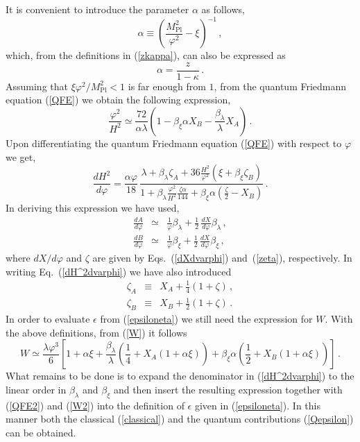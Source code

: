It is convenient to introduce the parameter $\alpha$ as follows,
\begin{equation}
\alpha \equiv \left(\frac{M_{\mathrm{Pl}}^2}{\varphi^2}-
\xi\right)^{-1}\,,
\end{equation}
which, from the definitions in (\ref{zkappa}), can also be
expressed as
\begin{equation}
\alpha = \frac{z}{1-\kappa}\,.\label{alpha}
\end{equation}
Assuming that $\xi{\varphi^2}/{M_{\mathrm{Pl}}^2}<1$ is far
enough from $1$, from the quantum Friedmann
equation (\ref{QFE}) we obtain the following expression,
\begin{equation}
\frac{\varphi^2}{H^2} \simeq
\frac{72}{\alpha\lambda}\left(1-\beta_{\xi}\alpha X_B -
\frac{\beta_{\lambda}}{\lambda}X_A\right)\,.\label{QFE2}
\end{equation}
Upon differentiating the quantum Friedmann
equation (\ref{QFE}) with respect to $\varphi$ we get,
\begin{equation}
\frac{dH^2}{d\varphi} = \frac{\alpha\varphi}{18}\,\frac{\lambda +
\beta_{\lambda}\zeta_A +
36\frac{H^2}{\varphi^2}\left(\xi+\beta_{\xi}\zeta_B\right)}{1+\beta_{\lambda}\frac{\varphi^2}{H^2}\frac{\zeta\alpha}{144}+
\beta_{\xi}\alpha\left(\frac{\zeta}{2}-X_B\right)}\label{dH^2dvarphi}\,.
\end{equation}
In deriving this expression we have used,
\begin{eqnarray}
\frac{dA}{d\varphi} &\simeq& \frac{1}{\varphi}\beta_{\lambda}
+\frac{1}{2}\,\frac{dX}{d\varphi}\beta_{\lambda}\,,\nonumber\\
\frac{dB}{d\varphi} &\simeq& \frac{1}{\varphi}\beta_{\xi}
+\frac{1}{2}\,\frac{dX}{d\varphi}\beta_{\xi}\,,
\end{eqnarray}
where ${dX}/{d\varphi}$ and $\zeta$ are given by Eqs.~(\ref{dXdvarphi})
and~(\ref{zeta}), respectively. In writing
Eq.~(\ref{dH^2dvarphi}) we have also introduced
\begin{eqnarray}
\zeta_A &\equiv& X_A+ \frac14(1+\zeta)\,,
\nonumber\\
\zeta_B &\equiv& X_B+\frac12(1+\zeta)\,.
\end{eqnarray}
In order to evaluate $\epsilon$ from (\ref{epsiloneta}) we still need the
expression for $W$. With the above definitions, from (\ref{W}) it
follows
\begin{equation}
W \simeq \frac{\lambda\varphi^3}{6}\left[1+\alpha\xi
+\frac{\beta_{\lambda}}{\lambda}\left(\frac14 +X_A(1+\alpha\xi)\right)
 +\beta_{\xi}\alpha\left(\frac12+X_B(1+\alpha\xi)\right)\right]
\,.
\label{W2}
\end{equation}
What remains to be done is to expand the denominator in
(\ref{dH^2dvarphi}) to the linear order in $\beta_{\lambda}$ and
$\beta_{\xi}$ and then insert the resulting expression together
with (\ref{QFE2}) and (\ref{W2}) into the definition of $\epsilon$ given in
(\ref{epsiloneta}). In this manner both the classical
(\ref{classical}) and the quantum contributions ({\ref{Qepsilon}}) can
be obtained.

